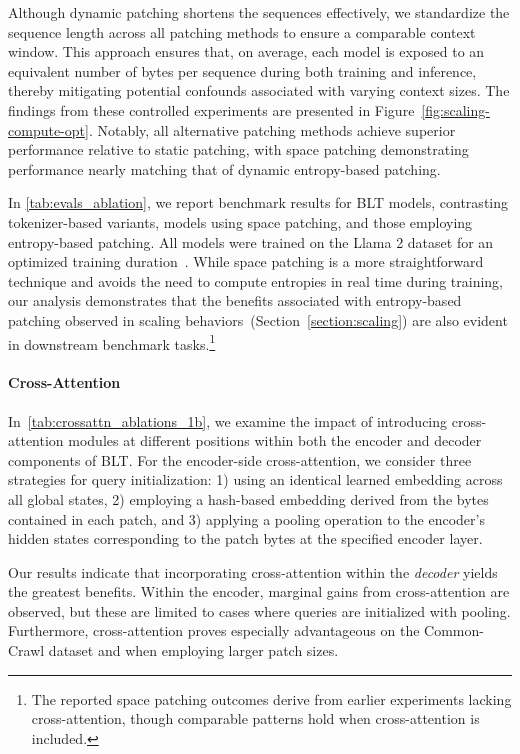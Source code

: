 Although dynamic patching shortens the sequences effectively, we standardize the sequence length across all patching methods to ensure a comparable context window. This approach ensures that, on average, each model is exposed to an equivalent number of bytes per sequence during both training and inference, thereby mitigating potential confounds associated with varying context sizes. The findings from these controlled experiments are presented in Figure~\ref{fig:scaling-compute-opt}. Notably, all alternative patching methods achieve superior performance relative to static patching, with space patching demonstrating performance nearly matching that of dynamic entropy-based patching.

In \autoref{tab:evals_ablation}, we report benchmark results for {\textsc BLT} models, contrasting tokenizer-based variants, models using space patching, and those employing entropy-based patching. All models were trained on the Llama 2 dataset for an optimized training duration~\citep{dubey2024llama}. While space patching is a more straightforward technique and avoids the need to compute entropies in real time during training, our analysis demonstrates that the benefits associated with entropy-based patching observed in scaling behaviors~(Section~\ref{section:scaling}) are also evident in downstream benchmark tasks.\footnote{The reported space patching outcomes derive from earlier experiments lacking cross-attention, though comparable patterns hold when cross-attention is included.}

\paragraph{Cross-Attention} 
In~\autoref{tab:crossattn_ablations_1b}, we examine the impact of introducing cross-attention modules at different positions within both the encoder and decoder components of {\textsc BLT}. For the encoder-side cross-attention, we consider three strategies for query initialization: 1) using an identical learned embedding across all global states, 2) employing a hash-based embedding derived from the bytes contained in each patch, and 3) applying a pooling operation to the encoder’s hidden states corresponding to the patch bytes at the specified encoder layer.

Our results indicate that incorporating cross-attention within the \textit{decoder} yields the greatest benefits. Within the encoder, marginal gains from cross-attention are observed, but these are limited to cases where queries are initialized with pooling. Furthermore, cross-attention proves especially advantageous on the Common-Crawl dataset and when employing larger patch sizes.

